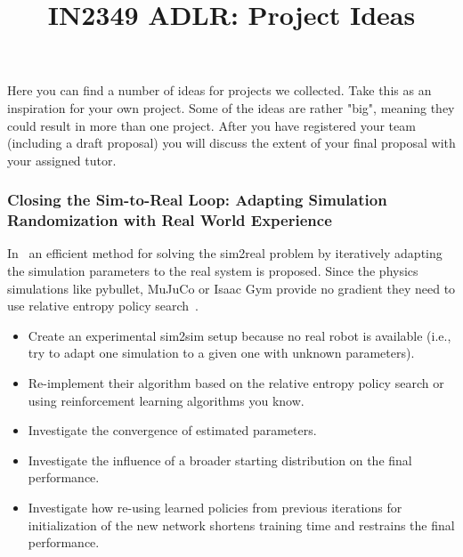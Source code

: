 \documentclass[a4paper]{article}
\title{IN2349 ADLR: Project Ideas}
\author{}
\begin{document}
\maketitle

Here you can find a number of ideas for projects we collected.
Take this as an inspiration for your own project.
Some of the ideas are rather "big", meaning they could result in more than one project.
After you have registered your team (including a draft proposal) you will discuss the extent of your final proposal with your assigned tutor.


\subsubsection{Closing the Sim-to-Real Loop: Adapting Simulation Randomization with Real World Experience}
In~\citet{Chebotar2018} an efficient method for solving the sim2real problem by iteratively adapting the simulation parameters to the real system is proposed.
Since the physics simulations like pybullet, MuJuCo or Isaac Gym provide no gradient they need to use relative entropy policy search~\citet{peters2010relative}.

\begin{itemize}
  \item Create an experimental sim2sim setup because no real robot is available (i.e., try to adapt one simulation to a given one with unknown parameters).
  \item Re-implement their algorithm based on the relative entropy policy search or using reinforcement learning algorithms you know.
  \item Investigate the convergence of estimated parameters.
  \item Investigate the influence of a broader starting distribution on the final performance.
  \item Investigate how re-using learned policies from previous iterations for initialization of the new network shortens training time and restrains the final performance.
\end{itemize}
\end{document}
